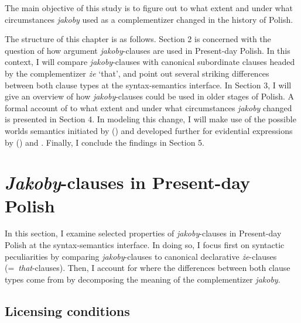 \documentclass[output=paper
,modfonts
,nonflat]{langsci/langscibook}
\begin{document}
The main objective of this study is to figure out to what extent and under what circumstances \emph{jakoby} used as a complementizer changed in the history of Polish.

The structure of this chapter is as follows. Section 2 is concerned with the question of how argument \emph{jakoby}-clauses are used in Present-day Polish. In this context, I will compare \emph{jakoby}-clauses with canonical subordinate clauses headed by the complementizer \emph{że} `that', and point out several striking differences between both clause types at the syntax-semantics interface. In Section 3, I will give an overview of how \emph{jakoby}-clauses could be used in older stages of Polish. A formal account of to what extent and under what circumstances \emph{jakoby} changed is presented in Section 4. In modeling this change, I will make use of the possible worlds semantics initiated by \citeauthor{Kratzer1981} (\citeyear{Kratzer1981, Kratzer1991, Kratzer2012}) and developed further for evidential expressions by \citeauthor{Faller2002} (\citeyear{Faller2002, Faller2011}) and \textcite{Lisa-Matthewson-Davis2017}.  Finally, I conclude the findings in Section 5. 

\section{\emph{Jakoby}-clauses in Present-day Polish} 

In this section, I examine selected properties of \emph{jakoby}-clauses in Present-day Polish at the syntax-semantics interface. In doing so, I focus first on syntactic peculiarities by comparing \emph{jakoby}-clauses to canonical declarative \emph{że}-clauses (=~\emph{that}-clauses). Then, I account for where the differences between both clause types come from by decomposing the meaning of the complementizer \emph{jakoby}. 

\subsection{Licensing conditions} \label{licensing_conditions}
\end{document}
